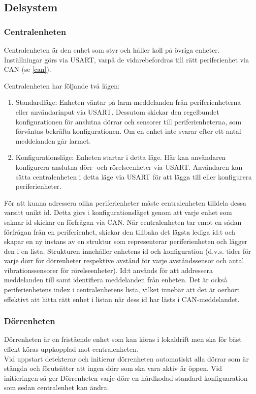 \documentclass{article}
\begin{document}
\subsection{Delsystem }
\subsubsection{Centralenheten}
Centralenheten är den enhet som styr och håller koll på övriga enheter. Inställningar görs via USART, varpå de vidarebefordras till rätt periferienhet via CAN (se \ref{can}). 

Centralenheten har följande två lägen:

\begin{enumerate}
    \item Standardläge: Enheten väntar på larm-meddelanden från periferienheterna eller användarinput via USART. Dessutom skickar den regelbundet  konfigurationen för anslutna dörrar och sensorer till periferienheterna, som förväntas bekräfta konfigurationen. Om en enhet inte svarar efter ett antal meddelanden går larmet.
    \item Konfigurationsläge: Enheten startar i detta läge. Här kan användaren konfigurera anslutna dörr- och rörelseenheter via USART. Användaren kan sätta centralenheten i detta läge via USART för att lägga till eller konfigurera periferienheter.
\end{enumerate}

För att kunna adressera olika periferienheter måste centralenheten tilldela dessa varsitt unikt id. Detta görs i konfigurationsläget genom att varje enhet som saknar id skickar en förfrågan via CAN. När centralenheten tar emot en sådan förfrågan från en periferienhet, skickar den tillbaka det lägsta lediga id:t och skapar en ny instans av en struktur som representerar periferienheten och lägger den i en lista. Strukturen innehåller enhetens id och konfiguration (d.v.s. tider för varje dörr för dörrenheter respektive avstånd för varje avståndssensor och antal vibrationssensorer för rörelseenheter). Id:t används för att addressera meddelanden till samt identifiera meddelanden från enheten. Det är också periferienhetens index i centralenhetens lista, vilket innebär att det är oerhört effektivt att hitta rätt enhet i listan när dess id har lästs i CAN-meddelandet.





\subsubsection{Dörrenheten}
Dörrenheten är en fristående enhet som kan köras i lokaldrift
men ska för bäst effekt köras uppkopplad mot centralenheten.\\
Vid uppstart detekterar och initierar dörrenheten automatiskt alla dörrar som
är stängda och förutsätter att ingen dörr som ska vara aktiv är
öppen. Vid initieringen så ger Dörrenheten varje dörr en hårdkodad
standard konfiguaration som sedan centralenhet kan ändra. 
\end{document}
